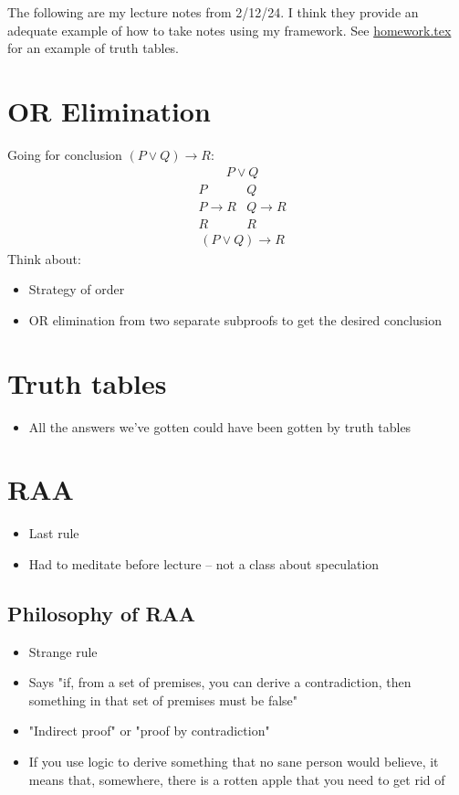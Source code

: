 \documentclass[12pt,letterpaper]{phi201}
\begin{document}
    

The following are my lecture notes from 2/12/24. I think they provide an adequate example of how to take notes using my framework. See \href{run:d:homework.tex}{homework.tex} for an example of truth tables.

\section{OR Elimination}
Going for conclusion $(P \lor Q) \to R$:
\begin{align*}
& P \lor Q
\end{align*}
\begin{align*}
& P & Q \\
& P \to R & Q \to R \\
& R & R
\end{align*}
\begin{align*}
& (P \lor Q) \to R
\end{align*}
Think about:
\begin{itemize}
    \item Strategy of order
    \item OR elimination from two separate subproofs to get the desired conclusion
\end{itemize}

\section{Truth tables}
\begin{itemize}
    \item All the answers we've gotten could have been gotten by truth tables
\end{itemize}

\section{RAA}
\begin{itemize}
    \item Last rule
    \item Had to meditate before lecture -- not a class about speculation
\end{itemize}
\subsection{Philosophy of RAA}
\begin{itemize}
    \item Strange rule
    \item Says "if, from a set of premises, you can derive a contradiction, then something in that set of premises must be false"
    \item "Indirect proof" or "proof by contradiction"
    \item If you use logic to derive something that no sane person would believe, it means that, somewhere, there is a rotten apple that you need to get rid of
\end{itemize}
\end{document}
